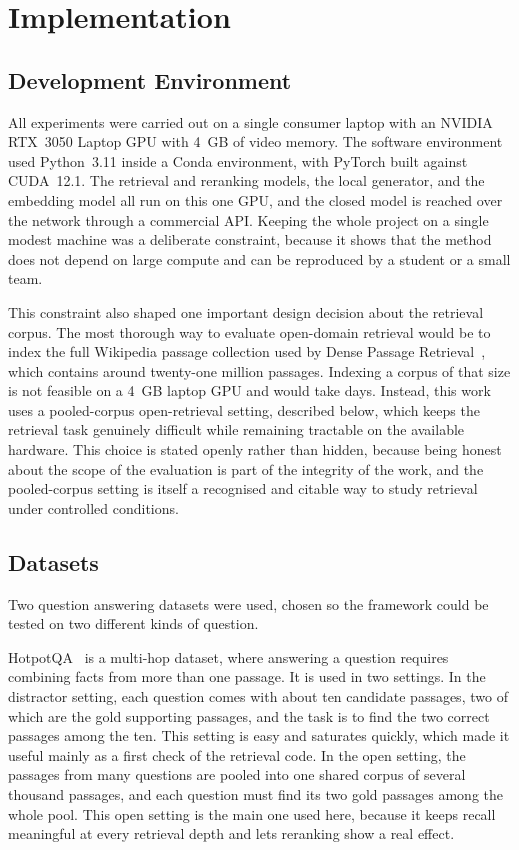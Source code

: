 \documentclass[conference,a4paper,10pt]{IEEEtran}
\begin{document}
\section{Implementation}
\label{sec:impl}

\subsection{Development Environment}
All experiments were carried out on a single consumer laptop with an NVIDIA RTX~3050
Laptop GPU with 4~GB of video memory. The software environment used Python~3.11 inside a
Conda environment, with PyTorch built against CUDA~12.1. The retrieval and reranking
models, the local generator, and the embedding model all run on this one GPU, and the
closed model is reached over the network through a commercial API. Keeping the whole
project on a single modest machine was a deliberate constraint, because it shows that the
method does not depend on large compute and can be reproduced by a student or a small
team.

This constraint also shaped one important design decision about the retrieval corpus. The
most thorough way to evaluate open-domain retrieval would be to index the full Wikipedia
passage collection used by Dense Passage Retrieval~\cite{karpukhin2020dpr}, which contains
around twenty-one million passages. Indexing a corpus of that size is not feasible on a
4~GB laptop GPU and would take days. Instead, this work uses a pooled-corpus
open-retrieval setting, described below, which keeps the retrieval task genuinely
difficult while remaining tractable on the available hardware. This choice is stated
openly rather than hidden, because being honest about the scope of the evaluation is part
of the integrity of the work, and the pooled-corpus setting is itself a recognised and
citable way to study retrieval under controlled conditions.

\subsection{Datasets}
Two question answering datasets were used, chosen so the framework could be tested on two
different kinds of question.

HotpotQA~\cite{yang2018hotpotqa} is a multi-hop dataset, where answering a question
requires combining facts from more than one passage. It is used in two settings. In the
distractor setting, each question comes with about ten candidate passages, two of which
are the gold supporting passages, and the task is to find the two correct passages among
the ten. This setting is easy and saturates quickly, which made it useful mainly as a
first check of the retrieval code. In the open setting, the passages from many questions
are pooled into one shared corpus of several thousand passages, and each question must
find its two gold passages among the whole pool. This open setting is the main one used
here, because it keeps recall meaningful at every retrieval depth and lets reranking show
a real effect.
\end{document}
